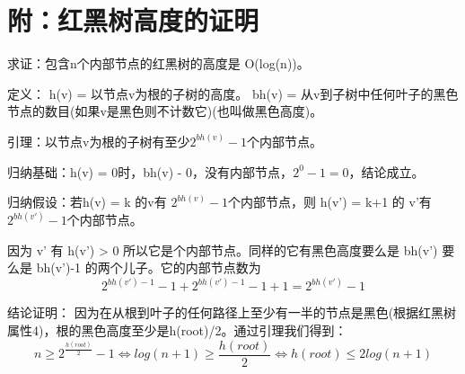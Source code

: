 \documentclass[12pt,a4paper]{article}
\begin{document}
\section{附：红黑树高度的证明}
求证：包含n个内部节点的红黑树的高度是 O(log(n))。\par
定义：
h(v) = 以节点v为根的子树的高度。
bh(v) = 从v到子树中任何叶子的黑色节点的数目(如果v是黑色则不计数它)(也叫做黑色高度)。\par
引理：以节点v为根的子树有至少$2^{bh(v) }− 1$个内部节点。\par
归纳基础：h(v) = 0时，bh(v) - 0，没有内部节点，$2^0-1=0$，结论成立。\par
归纳假设：若h(v) = k 的v有 $2^{bh(v)} − 1 $个内部节点，则 h(v') = k+1 的 v'有$2^{bh(v')}− 1 $个内部节点。\par
因为 v' 有 h(v') > 0 所以它是个内部节点。同样的它有黑色高度要么是 bh(v') 要么是 bh(v')-1 的两个儿子。它的内部节点数为
\[2^{bh(v') − 1} − 1 + 2^{bh(v') − 1} − 1 + 1 = 2^{bh(v')} − 1\]\par
结论证明：
因为在从根到叶子的任何路径上至少有一半的节点是黑色(根据红黑树属性4)，根的黑色高度至少是h(root)/2。通过引理我们得到：
\[
n\geq 2^{\frac{h(root)}{2}}-1 \Leftrightarrow log(n+1) \geq \frac{h(root)}{2} \Leftrightarrow h(root)\leq 2log(n+1)
\]
\end{document}
